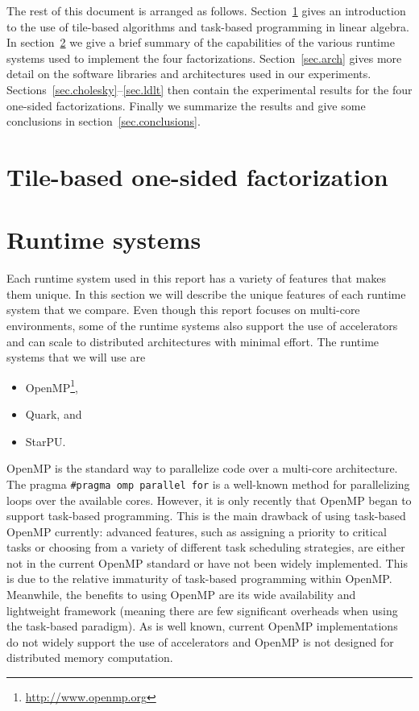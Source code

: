\documentclass[a4paper,12pt]{article}
\begin{document}
The rest of this document is arranged as follows.
Section~\ref{sec.tile} gives an introduction
to the use of tile-based algorithms and
task-based programming in linear algebra.
In section~\ref{sec.runtime_systems} we give a
brief summary of the capabilities of the various
runtime systems used to implement the four factorizations.
Section~\ref{sec.arch} gives more detail on the
software libraries and architectures used in our experiments.
Sections~\ref{sec.cholesky}--\ref{sec.ldlt} then
contain the experimental results for the four
one-sided factorizations.
Finally we summarize the results and give some conclusions
in section~\ref{sec.conclusions}.

\section{Tile-based one-sided factorization}
\label{sec.tile}




\section{Runtime systems}
\label{sec.runtime_systems}
Each runtime system used in this report has a variety of
features that makes them unique.
In this section we will describe the unique features of each runtime
system that we compare.
Even though this report focuses on multi-core environments,
some of the runtime systems also support the use of accelerators
and can scale to distributed architectures with
minimal effort.
The runtime systems that we will use are
\begin{itemize}
\item OpenMP\footnote{\url{http://www.openmp.org}},
\item Quark, and
\item StarPU.
\end{itemize}

OpenMP is the standard way to parallelize code over a
multi-core architecture.  The pragma
\texttt{\#pragma omp parallel for}
is a well-known method for parallelizing loops
over the available cores.
However, it is only recently that OpenMP
began to support task-based programming.  This is the main drawback of
using task-based OpenMP currently: advanced features, such as
assigning a priority to critical tasks or choosing from a variety of
different task scheduling strategies, are either not in the current
OpenMP standard or have not been widely implemented.  This is due to
the relative immaturity of task-based programming within OpenMP.
Meanwhile, the benefits to using OpenMP are its wide availability and
lightweight framework (meaning there are few significant overheads
when using the task-based paradigm).  As is well known, current
OpenMP implementations do not widely support the use of accelerators
and OpenMP is not designed for distributed memory computation.
\end{document}
